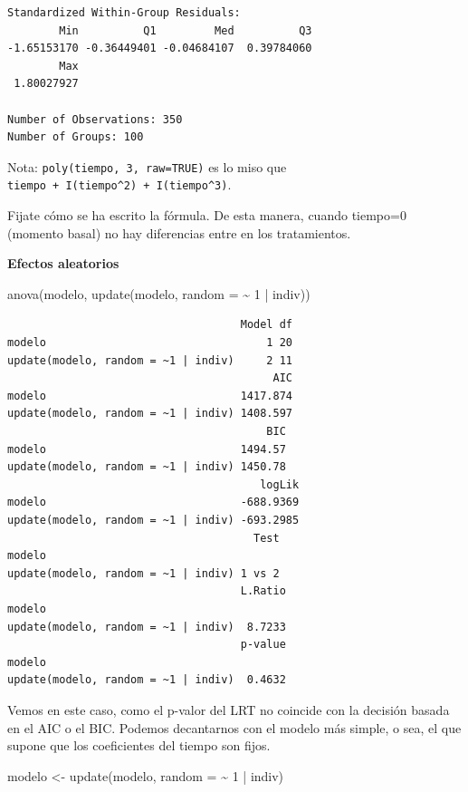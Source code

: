 \documentclass[
]{book}
\newenvironment{Shaded}{\begin{snugshade}}{\end{snugshade}}
\newcommand{\AttributeTok}[1]{\textcolor[rgb]{0.77,0.63,0.00}{#1}}
\newcommand{\DecValTok}[1]{\textcolor[rgb]{0.00,0.00,0.81}{#1}}
\newcommand{\FunctionTok}[1]{\textcolor[rgb]{0.00,0.00,0.00}{#1}}
\newcommand{\NormalTok}[1]{#1}
\newcommand{\OtherTok}[1]{\textcolor[rgb]{0.56,0.35,0.01}{#1}}
\newcommand{\SpecialCharTok}[1]{\textcolor[rgb]{0.00,0.00,0.00}{#1}}
\begin{document}
\begin{verbatim}
Standardized Within-Group Residuals:
        Min          Q1         Med          Q3 
-1.65153170 -0.36449401 -0.04684107  0.39784060 
        Max 
 1.80027927 

Number of Observations: 350
Number of Groups: 100 
\end{verbatim}

Nota: \texttt{poly(tiempo,\ 3,\ raw=TRUE)} es lo miso que \texttt{tiempo\ +\ I(tiempo\^{}2)\ +\ I(tiempo\^{}3)}.

Fijate cómo se ha escrito la fórmula. De esta manera, cuando tiempo=0 (momento basal) no hay diferencias entre en los tratamientos.

\textbf{Efectos aleatorios}

\begin{Shaded}
\begin{Highlighting}[]
\FunctionTok{anova}\NormalTok{(modelo, }\FunctionTok{update}\NormalTok{(modelo, }\AttributeTok{random =} \SpecialCharTok{\textasciitilde{}} \DecValTok{1} \SpecialCharTok{|}\NormalTok{ indiv))}
\end{Highlighting}
\end{Shaded}

\begin{verbatim}
                                    Model df
modelo                                  1 20
update(modelo, random = ~1 | indiv)     2 11
                                         AIC
modelo                              1417.874
update(modelo, random = ~1 | indiv) 1408.597
                                        BIC
modelo                              1494.57
update(modelo, random = ~1 | indiv) 1450.78
                                       logLik
modelo                              -688.9369
update(modelo, random = ~1 | indiv) -693.2985
                                      Test
modelo                                    
update(modelo, random = ~1 | indiv) 1 vs 2
                                    L.Ratio
modelo                                     
update(modelo, random = ~1 | indiv)  8.7233
                                    p-value
modelo                                     
update(modelo, random = ~1 | indiv)  0.4632
\end{verbatim}

Vemos en este caso, como el p-valor del LRT no coincide con la decisión basada en el AIC o el BIC. Podemos decantarnos con el modelo más simple, o sea, el que supone que los coeficientes del tiempo son fijos.

\begin{Shaded}
\begin{Highlighting}[]
\NormalTok{modelo }\OtherTok{\textless{}{-}} \FunctionTok{update}\NormalTok{(modelo, }\AttributeTok{random =} \SpecialCharTok{\textasciitilde{}} \DecValTok{1} \SpecialCharTok{|}\NormalTok{ indiv)}
\end{Highlighting}
\end{Shaded}
\end{document}
